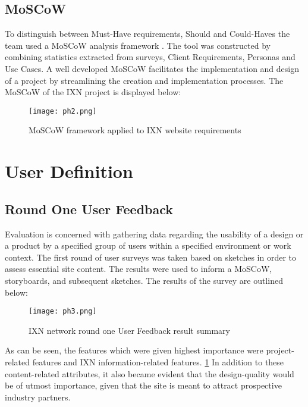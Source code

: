 \documentclass[fontsize=11pt]{extarticle}
\numberwithin{figure}{section} %
\begin{document}
\hypertarget{moscow}{%
\subsection{MoSCoW}\label{moscow}}

To distinguish between Must-Have requirements, Should and Could-Haves
the team used a MoSCoW analysis framework \cite{g4}. The tool was
constructed by combining statistics extracted from surveys, Client
Requirements, Personas and Use Cases. A well developed MoSCoW
facilitates the implementation and design of a project by streamlining
the creation and implementation processes. The MoSCoW of the IXN project
is displayed below:

\newpage

\begin{landscape}
\begin{figure}[H]
      \centering
      \texttt{[image: ph2.png]}
      \caption{MoSCoW framework applied to IXN website requirements}
 \end{figure}
 \end{landscape}

\hypertarget{user-definition}{%
\section{User Definition}\label{user-definition}}

\hypertarget{round-one-user-feedback}{%
\subsection{Round One User Feedback}\label{round-one-user-feedback}}

Evaluation is concerned with gathering data regarding the usability of a
design or a product by a specified group of users within a specified
environment or work context. The first round of user surveys was taken
based on sketches in order to assess essential site content. The results
were used to inform a MoSCoW, storyboards, and subsequent sketches. The
results of the survey are outlined below:

\begin{figure}[H]
      \centering
      \texttt{[image: ph3.png]}
      \caption{IXN network round one User Feedback result summary}
\label{userfeedback}
 \end{figure}

As can be seen, the features which were given highest importance were
project-related features and IXN information-related features.
\ref{userfeedback} In addition to these content-related attributes, it
also became evident that the design-quality would be of utmost
importance, given that the site is meant to attract prospective industry
partners.
\end{document}
